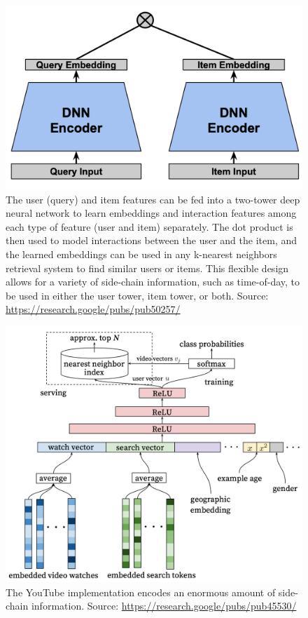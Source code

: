 \documentclass{article}
\begin{document}
\begin{figure}[h]
\begin{center}
  \includegraphics[width=0.75\linewidth]{two_tower.png}
  \end{center}
  \caption{The user (query) and item features can be fed into a two-tower deep neural network to learn embeddings and interaction features among each type of feature (user and item) separately. The dot product is then used to model interactions between the user and the item, and the learned embeddings can be used in any k-nearest neighbors retrieval system to find similar users or items. This flexible design allows for a variety of side-chain information, such as time-of-day, to be used in either the user tower, item tower, or both. Source: \url{https://research.google/pubs/pub50257/}}
  \label{fig:two_tower}
\end{figure}

\begin{figure}[h]
\begin{center}
  \includegraphics[width=0.75\linewidth]{youtube_figure.png}
  \end{center}
  \caption{The YouTube implementation encodes an enormous amount of side-chain information. Source: \url{https://research.google/pubs/pub45530/}}
  \label{fig:you_tube}
\end{figure}
\end{document}
